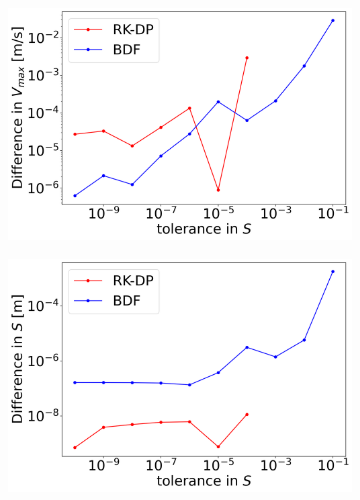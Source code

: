 \begin{figure}[H]
	\centering
	\begin{subfigure}[t]{0.32\textwidth}
		\centering
		\includegraphics[width=1\textwidth]{images/TANDEMcompactODEDifferentTolerancesSize101_EQ_Vmax.png}
	\end{subfigure} 
	\begin{subfigure}[t]{0.32\textwidth}
		\centering
		\includegraphics[width=1\textwidth]{images/TANDEMcompactODEDifferentTolerancesSize101_EQ_Smin.png}
	\end{subfigure}
	\begin{subfigure}[t]{0.32\textwidth}
		\centering

\end{subfigure}
\end{figure}
